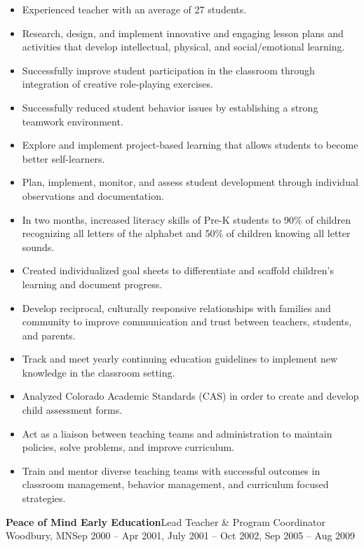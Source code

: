 \documentclass[letterpaper,10pt]{article}
\begin{document}
\begin{itemize}
    \item Experienced teacher with an average of 27 students.
    \item Research, design, and implement innovative and engaging lesson plans and activities that develop intellectual, physical, and social/emotional learning.
    \item Successfully improve student participation in the classroom through integration of creative role-playing exercises.
    \item Successfully reduced student behavior issues by establishing a strong teamwork environment.
    \item Explore and implement project-based learning that allows students to become better self-learners.
    \item Plan, implement, monitor, and assess student development through individual observations and documentation.
    \item In two months, increased literacy skills of Pre-K students to 90\% of children recognizing
    all letters of the alphabet and 50\% of children knowing all letter sounds.
    \item Created individualized goal sheets to differentiate and scaffold children's learning and document progress.
    \item Develop reciprocal, culturally responsive relationships with families and community to improve communication
    and trust between teachers, students, and parents.
    \item Track and meet yearly continuing education guidelines to implement new knowledge in the classroom setting.
    \item Analyzed Colorado Academic Standards (CAS) in order to create and develop child assessment forms.
    \item Act as a liaison between teaching teams and administration to maintain policies, solve problems, and improve curriculum.
    \item Train and mentor diverse teaching teams with successful outcomes in classroom management, behavior management, and curriculum focused strategies.
\end{itemize}

\pagebreak
\textbf{Peace of Mind Early Education}\hfill Lead Teacher \& Program Coordinator
\smallbreak Woodbury, MN\hfill Sep 2000 -- Apr 2001, July 2001 -- Oct 2002, Sep 2005 -- Aug 2009
\end{document}
